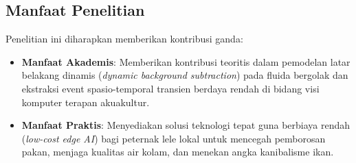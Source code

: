 \subsection{Manfaat Penelitian}
Penelitian ini diharapkan memberikan kontribusi ganda:
\begin{itemize}
    \item \textbf{Manfaat Akademis}: Memberikan kontribusi teoritis dalam pemodelan latar belakang dinamis (\textit{dynamic background subtraction}) pada fluida bergolak dan ekstraksi event spasio-temporal transien berdaya rendah di bidang visi komputer terapan akuakultur.
    \item \textbf{Manfaat Praktis}: Menyediakan solusi teknologi tepat guna berbiaya rendah (\textit{low-cost edge AI}) bagi peternak lele lokal untuk mencegah pemborosan pakan, menjaga kualitas air kolam, dan menekan angka kanibalisme ikan.
\end{itemize}

